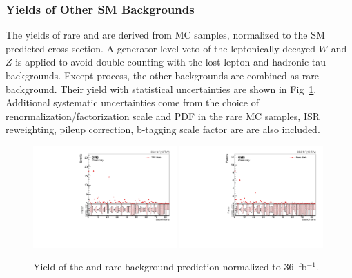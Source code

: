 \subsubsection{Yields of Other SM Backgrounds}
\label{sss:otherSM}
The yields of rare and \ttbarZ are derived from MC samples, normalized to the
SM predicted cross section. A generator-level veto of the leptonically-decayed
$W$ and $Z$ is applied to avoid double-counting with the lost-lepton and
hadronic tau backgrounds. Except \ttbarZ process, the other backgrounds are
combined as rare background. Their yield with statistical uncertainties are
shown in Fig~\ref{fig:ttZRareYeild}. Additional systematic uncertainties come from the choice
of renormalization/factorization scale and PDF in the rare MC samples, ISR
reweighting, pileup correction, b-tagging scale factor are are also included.

\begin{figure}[htbp]
  \begin{center}
    \includegraphics[width=0.49\textwidth]{sections/mc4/Backgrounds/TTZRare/figures/TTZ_Stat.pdf}
    \includegraphics[width=0.49\textwidth]{sections/mc4/Backgrounds/TTZRare/figures/Rare_Stat.pdf}
  \end{center}
  \caption{Yield of the \ttbarZ and rare background prediction normalized to
  $36$~fb$^{-1}$.}
  \label{fig:ttZRareYeild}
\end{figure}
